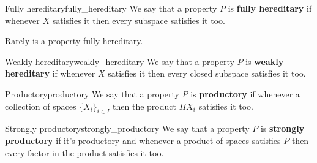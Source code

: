 \documentclass[a4paper]{book}
\theoremstyle{definition}
\theoremstyle{ejemplo}
\theoremstyle{demostracion}
\begin{document}
\begin{define}{Fully hereditary}{fully_hereditary}
	We say that a property $P$ is \textbf{fully hereditary} if whenever $X$ satisfies it then every subspace satisfies it too.
\end{define}

Rarely is a property fully hereditary.

\begin{define}{Weakly hereditary}{weakly_hereditary}
	We say that a property $P$ is \textbf{weakly hereditary} if whenever $X$ satisfies it then every closed subspace satisfies it too.
\end{define}

\begin{define}{Productory}{productory}
	We say that a property $P$ is \textbf{productory} if whenever a collection of spaces $\{ X_i\}_{i \in I}$ then the product $\Pi X_i$ satisfies it too.
\end{define}

\begin{define}{Strongly productory}{strongly_productory}
	We say that a property $P$ is \textbf{strongly productory} if it's productory and whenever a product of spaces satisfies $P$ then every factor in the product satisfies it too.
\end{define}
\end{document}
